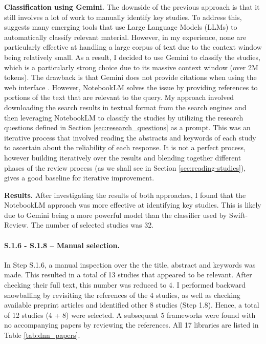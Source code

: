 \textbf{Classification using Gemini.}
The downside of the previous approach is that it still involves a lot of work to manually identify key
studies. To address this, \cite{bolanos_artificial_2024} suggests many emerging tools that use Large Language Models (LLMs)
to automatically classify relevant material. However, in my experience, none are particularly effective
at handling a large corpus of text due to the context window being relatively small. As a result, I decided
to use Gemini \cite{team_gemini_2024} to classify the studies, which is a particularly strong choice due to its massive
context window (over 2M tokens). The drawback is that Gemini does not provide citations when using the web interface
\cite{noauthor_gemini_nodate}. However, NotebookLM \cite{notebooklm_google_2024} solves the issue by providing references
to portions of the text that are relevant to the query. My approach involved downloading the search results in textual format from the
search engines and then leveraging NotebookLM to classify the studies by utilizing the research questions
defined in Section \ref{sec:research_questions} as a prompt. This was an iterative process that involved
reading the abstracts and keywords of each study to ascertain about the reliability of each response. It is not a perfect process,
however building iteratively over the results and blending together different phases of the review process
(as we shall see in Section \ref{sec:reading-studies}), gives a good baseline for iterative improvement.

\textbf{Results.}
After investigating the results of both approaches, I found that the NotebookLM approach was more
effective at identifying key studies. This is likely due to Gemini being a more powerful
model than the classifier used by Swift-Review. The number of selected studies was 32.

\paragraph{S.1.6 - S.1.8 -- Manual selection.}
In Step S.1.6, a manual inspection over the the title, abstract and keywords was made. This
resulted in a total of 13 studies that appeared to be relevant. After checking their full text,
this number was reduced to 4. I performed backward snowballing \cite{jalali_systematic_2012} by
revisiting the references of the 4 studies, as well as checking available preprint articles and
identified other 8 studies (Step 1.8). Hence, a total of 12 studies (4 + 8) were selected. A
subsequent 5 frameworks were found with no accompanying papers by reviewing the references. All 17
libraries are listed in Table \ref{tab:dnn_papers}.


